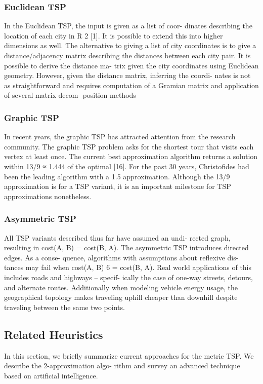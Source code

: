 \documentclass[10pt,twocolumn,letterpaper]{article}
\begin{document}
\subsubsection{Euclidean TSP}
In the Euclidean TSP, the input is given as a list of coor-
dinates describing the location of each city in R 2 [1]. It is
possible to extend this into higher dimensions as well. The
alternative to giving a list of city coordinates is to give a
distance/adjacency matrix describing the distances between
each city pair. It is possible to derive the distance ma-
trix given the city coordinates using Euclidean geometry.
However, given the distance matrix, inferring the coordi-
nates is not as straightforward and requires computation of
a Gramian matrix and application of several matrix decom-
position methods
\
\subsubsection{Graphic TSP}
In recent years, the graphic TSP has attracted attention
from the research community. The graphic TSP problem
asks for the shortest tour that visits each vertex at least
once. The current best approximation algorithm returns a
solution within 13/9 ≈ 1.444 of the optimal [16]. For the
past 30 years, Christofides had been the leading algorithm
with a 1.5 approximation. Although the 13/9 approximation
is for a TSP variant, it is an important milestone for TSP
approximations nonetheless.

\subsubsection{Asymmetric TSP}
All TSP variants described thus far have assumed an undi-
rected graph, resulting in cost(A, B) = cost(B, A). The
asymmetric TSP introduces directed edges. As a conse-
quence, algorithms with assumptions about reflexive dis-
tances may fail when cost(A, B) 6 = cost(B, A). Real world
applications of this includes roads and highways – specif-
ically the case of one-way streets, detours, and alternate
routes. Additionally when modeling vehicle energy usage,
the geographical topology makes traveling uphill cheaper
than downhill despite traveling between the same two points.

\subsection{Related Heuristics}
In this section, we briefly summarize current approaches
for the metric TSP. We describe the 2-approximation algo-
rithm and survey an advanced technique based on artificial
intelligence.
\end{document}
